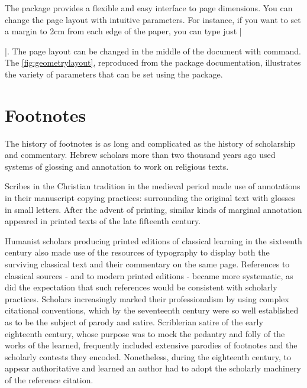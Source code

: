 \begin{comment}
  \put(450,70){\makebox(0,0)[l]{|marginparsep|}}
  \put(448,70){\line(-3,-1){43}}
  \put(450,45){\makebox(0,0)[l]{|marginparwidth|}}
  \end{picture}
\caption{Dimension names used in the geometry package. width $=$ textwidth and height $=$ textheight by default. left, right, top and bottom are margins. If margins on verso pages are swapped by twoside option, margins specified by left and right options are used for the inside and outside margins respectively. inner and outer are aliases of left and right
respectively.}
\label{fig:geometrylayout}
\end{figure}
\makeatother
\egroup
\end{comment}

 The  package provides a flexible and easy interface to page dimensions.
 You can change the page layout with intuitive parameters. For instance,
 if you want to set a margin to 2cm from each edge of the paper,
 you can type just |\usepackage[margin=2cm]{geometry}|. 
 The page layout can be changed in the middle of the document
 with  command.  The \ref{fig:geometrylayout}, reproduced from the package documentation, illustrates the variety of parameters that can be set using the package.


\section{Footnotes}
The history of footnotes is as long and complicated as the history of scholarship and commentary. Hebrew scholars more than two thousand years ago used systems of glossing and annotation to work on religious texts. 

Scribes in the Christian tradition in the medieval period made use of annotations in their manuscript copying practices: surrounding the original text with glosses in small letters. After the advent of printing, similar kinds of marginal annotation appeared in printed texts of the late fifteenth century. 

Humanist scholars producing printed editions of classical learning in the sixteenth century also made use of the resources of typography to display both the surviving classical text and their commentary on the same page. References to classical sources - and to modern printed editions - became more systematic, as did the expectation that such references would be consistent with scholarly practices. Scholars increasingly marked their professionalism by using complex citational conventions, which by the seventeenth century were so well established as to be the subject of parody and satire. Scriblerian satire of the early eighteenth century, whose purpose was to mock the pedantry and folly of the works of the learned, frequently included extensive parodies of footnotes and the scholarly contests they encoded. Nonetheless, during the eighteenth century, to appear authoritative and learned an author had to adopt the scholarly machinery of the reference citation.


